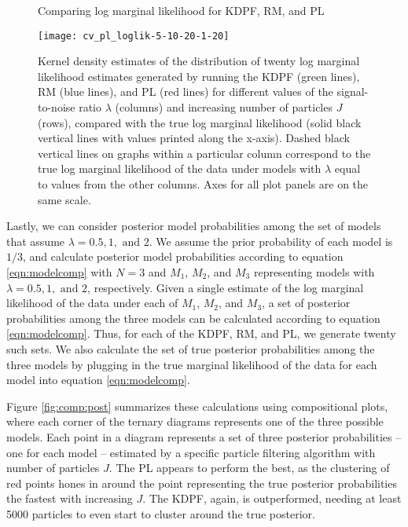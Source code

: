 \begin{figure}[ht]
\ssp
\centering
\caption{Comparing log marginal likelihood for KDPF, RM, and PL} \label{fig:comp:loglik}
\texttt{[image: cv\_pl\_loglik-5-10-20-1-20]}
\caption*{Kernel density estimates of the distribution of twenty log marginal likelihood estimates generated by running the KDPF (green lines), RM (blue lines), and PL (red lines) for different values of the signal-to-noise ratio $\lambda$ (columns) and increasing number of particles $J$ (rows), compared with the true log marginal likelihood (solid black vertical lines with values printed along the x-axis). Dashed black vertical lines on graphs within a particular column correspond to the true log marginal likelihood of the data under models with $\lambda$ equal to values from the other columns. Axes for all plot panels are on the same scale.}
\end{figure}

Lastly, we can consider posterior model probabilities among the set of models that assume $\lambda = 0.5, 1, \mbox{ and } 2$. We assume the prior probability of each model is $1/3$, and calculate posterior model probabilities according to equation \eqref{eqn:modelcomp} with $N = 3$ and $M_1$, $M_2$, and $M_3$ representing models with $\lambda = 0.5, 1, \mbox{ and } 2$, respectively. Given a single estimate of the log marginal likelihood of the data under each of $M_1$, $M_2$, and $M_3$, a set of posterior probabilities among the three models can be calculated according to equation \eqref{eqn:modelcomp}. Thus, for each of the KDPF, RM, and PL, we generate twenty such sets. We also calculate the set of true posterior probabilities among the three models by plugging in the true marginal likelihood of the data for each model into equation \eqref{eqn:modelcomp}.

Figure \ref{fig:comp:post} summarizes these calculations using compositional plots, where each corner of the ternary diagrams represents one of the three possible models. Each point in a diagram represents a set of three posterior probabilities -- one for each model -- estimated by a specific particle filtering algorithm with number of particles $J$. The PL appears to perform the best, as the clustering of red points hones in around the point representing the true posterior probabilities the fastest with increasing $J$. The KDPF, again, is outperformed, needing at least 5000 particles to even start to cluster around the true posterior.

